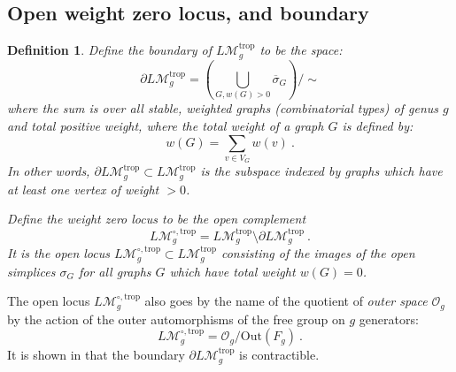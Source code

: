 \documentclass[12pt]{amsart}
\theoremstyle{plain}
\newtheorem{defn}[thm]{Definition}
\newcommand{\LM}{L\mathcal{M}}
\newcommand{\trop}{\mathrm{trop}}
\newcommand{\0}{\color{blue}{\mathsf{0}}}
\begin{document}
\subsection{Open weight zero locus, and boundary}


\begin{defn}
Define  the \emph{boundary}  of $\LM_g^{\trop}$ to be the space: 
\[  \partial \LM_g^{\trop} = \left(\bigcup_{G, w(G)>0}  \overline{\sigma}_G \right) / \sim \]
where the sum is over all stable, weighted  graphs  (combinatorial types) of genus $g$ and total positive weight, where the total weight of a graph $G$ is defined by:
\[ w(G) = \sum_{v\in V_G} w(v) \ .\]
In other words, $ \partial \LM_g^{\trop} \subset   \LM_g^{\trop} $ is the subspace indexed by graphs which have at least one vertex of weight $>0$.
 
 Define the weight zero locus to be the open complement
 \[   \LM_g^{\circ, \trop}  = \LM_g^{\trop} \setminus  \partial \LM_g^{\trop} \ .\]
 It is the open locus $ \LM_g^{\circ, \trop}  \subset \LM_g^{\trop} $ consisting of the images of the \emph{open} simplices $\sigma_G$ for all graphs $G$ which have total weight $w(G)=0$.
 \end{defn}
 

The open locus $\LM_g^{\circ, \trop}$ also goes by the name of the quotient of \emph{outer space} \cite{CullerVogtmann}  $\mathcal{O}_g$ by the action  of the outer automorphisms of the free group on $g$ generators:
\[   \LM_g^{\circ, \trop} = \mathcal{O}_g/ \mathrm{Out}(F_g) \ .\]
It is shown in \cite{CGP} that the boundary $\partial \LM_g^{\trop}$ is contractible. 
\end{document}
